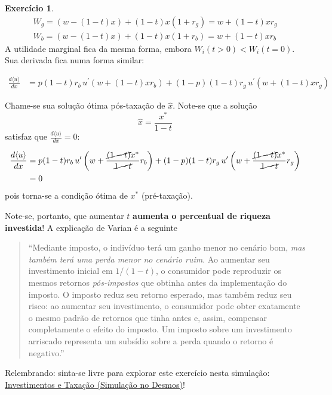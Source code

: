 \documentclass[12pt]{article}
\numberwithin{equation}{section}
\theoremstyle{plain}
\theoremstyle{definition}
\newtheorem{exercise}{Exercício}[section]
\theoremstyle{remark}
\begin{document}
\begin{exercise}
\begin{align*}
W_{g} = (w-(1-t)x) + (1-t)x (1+r_{g}) = w + (1-t)x r_{g}\\
W_{b} = (w-(1-t)x) + (1-t)x (1+r_{b}) = w + (1-t)x r_{b}
\end{align*} A utilidade marginal fica da mesma forma, embora
\(W_{i}(t>0) < W_{i}(t=0)\). Sua derivada fica numa forma similar:

\begin{align*}
\frac{d\langle u \rangle}{dx} &= p (1-t)r_{b}\,u^\prime(w + (1-t)x r_{b}) + (1-p) (1-t)r_{g}\,u^\prime(w + (1-t)x r_{g})
\end{align*}

Chame-se sua solução ótima pós-taxação de \(\hat{x}\). Note-se que a
solução
\[
\hat{x} = \frac{x^*}{1-t}
\]
satisfaz que \(\frac{d\langle u \rangle}{dx}=0\):

\begin{align*}
\frac{d\langle u \rangle}{dx} &= p (1-t)r_{b}\,u^\prime\left( w + \frac{\cancel{ (1-t) }x^*}{\cancel{ 1-t }} r_{b} \right) + (1-p) (1-t)r_{g}\,u^\prime\left( w + \frac{\cancel{ (1-t) }x^*}{\cancel{ 1-t }} r_{g} \right) \\
&= 0
\end{align*} pois torna-se a condição ótima de \(x^*\) (pré-taxação).

Note-se, portanto, que aumentar \(t\) \textbf{aumenta o percentual de
riqueza investida}! A explicação de Varian é a seguinte

\begin{quote}
``Mediante imposto, o indivíduo terá um ganho menor no cenário bom,
\textit{mas também terá uma perda menor no cenário ruim}. Ao aumentar
seu investimento inicial em \(1/(1 - t)\), o consumidor pode reproduzir
os mesmos retornos \textit{pós-impostos} que obtinha antes da
implementação do imposto. O imposto reduz seu retorno esperado, mas
também reduz seu risco: ao aumentar seu investimento, o consumidor pode
obter exatamente o mesmo padrão de retornos que tinha antes e, assim,
compensar completamente o efeito do imposto. Um imposto sobre um
investimento arriscado representa um subsídio sobre a perda quando o
retorno é negativo.'' \parencite[, p. 235]{Varian2014}
\end{quote}

Relembrando: sinta-se livre para explorar este exercício nesta
simulação:
\href{https://www.desmos.com/calculator/ppkg28wznf}{Investimentos e
Taxação (Simulação no Desmos)}!
\end{exercise}
\end{document}
